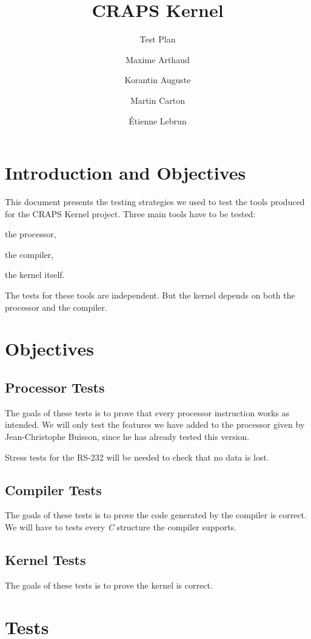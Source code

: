 \documentclass{article}
\title{CRAPS Kernel}
\subtitle{Test Plan}
\author{
       Maxime Arthaud
  \and Korantin Auguste
  \and Martin Carton
  \and Étienne Lebrun
}
\begin{document}
  
  \tableofcontents
  \newpage

  \section{Introduction and Objectives}
    This document presents the testing strategies we used to test the tools
    produced for the CRAPS Kernel project. Three main tools have to be tested:
    \begin{inparaenum}
      \item the processor,
      \item the compiler,
      \item the kernel itself.
    \end{inparaenum}

    The tests for these tools are independent. But the kernel depends on both
    the processor and the compiler.

  \section{Objectives}
    \subsection{Processor Tests}
      The goals of these tests is to prove that every processor instruction
      works as intended. We will only test the features we have added to the
      processor given by Jean-Christophe Buisson, since he has already tested
      this version.

      Stress tests for the RS-232 will be needed to check that no data is lost.

    \subsection{Compiler Tests}
      The goals of these tests is to prove the code generated by the compiler is
      correct. We will have to tests every \textit{C} structure the compiler
      supports.

    \subsection{Kernel Tests}
      The goals of these tests is to prove the kernel is correct.

  \section{Tests}
\end{document}
